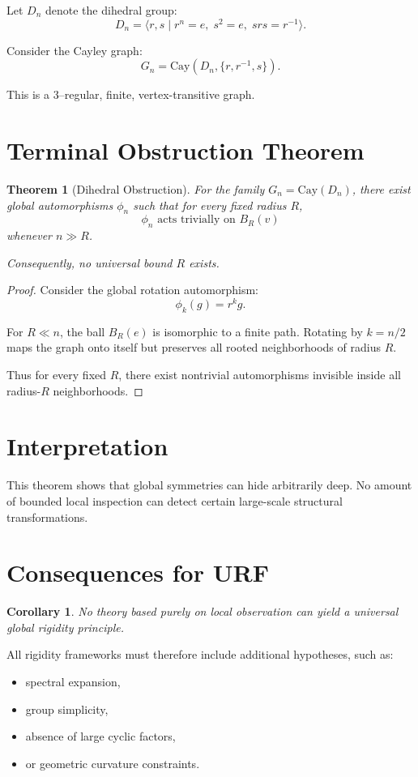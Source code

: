 \documentclass[11pt]{article}
\newtheorem{theorem}{Theorem}
\newtheorem{corollary}{Corollary}
\begin{document}
Let $D_n$ denote the dihedral group:
\[
D_n = \langle r, s \mid r^n = e,\; s^2 = e,\; srs = r^{-1} \rangle.
\]

Consider the Cayley graph:
\[
G_n = \mathrm{Cay}(D_n, \{r, r^{-1}, s\}).
\]

This is a $3$--regular, finite, vertex-transitive graph.

\section{Terminal Obstruction Theorem}

\begin{theorem}[Dihedral Obstruction]
For the family $G_n = \mathrm{Cay}(D_n)$,
there exist global automorphisms $\phi_n$ such that
for every fixed radius $R$,
\[
\phi_n \text{ acts trivially on } B_R(v)
\]
whenever $n \gg R$.

Consequently, no universal bound $R$ exists.
\end{theorem}

\begin{proof}
Consider the global rotation automorphism:
\[
\phi_k(g) = r^k g.
\]

For $R \ll n$, the ball $B_R(e)$ is isomorphic to a finite path.
Rotating by $k = n/2$ maps the graph onto itself but preserves
all rooted neighborhoods of radius $R$.

Thus for every fixed $R$, there exist nontrivial automorphisms
invisible inside all radius-$R$ neighborhoods.
\end{proof}

\section{Interpretation}

This theorem shows that global symmetries can hide arbitrarily deep.
No amount of bounded local inspection can detect certain large-scale
structural transformations.

\section{Consequences for URF}

\begin{corollary}
No theory based purely on local observation can yield a universal
global rigidity principle.
\end{corollary}

All rigidity frameworks must therefore include additional hypotheses,
such as:
\begin{itemize}
\item spectral expansion,
\item group simplicity,
\item absence of large cyclic factors,
\item or geometric curvature constraints.
\end{itemize}
\end{document}
